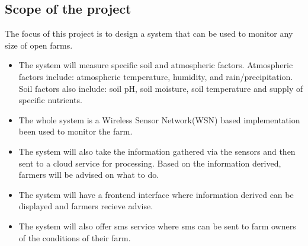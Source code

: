 \documentclass[12pt, a4paper]{article}
\begin{document}
\subsection{Scope of the project}
The focus of this project is to design a system that can be used to monitor any size of open farms.
\begin{itemize}
\item[--] The system will measure specific soil and atmospheric factors. Atmospheric factors include: atmospheric temperature, humidity, and rain/precipitation. Soil factors also include: soil pH, soil moisture, soil temperature and supply of specific nutrients.
\item[--] The whole system is a Wireless Sensor Network(WSN) based implementation been used to  monitor the farm.
\item[--] The system will also take the information gathered via the sensors and then sent to a cloud service for processing. Based on the information derived, farmers will be advised on what to do.
\item[--] The system will have a frontend interface where information derived can be displayed and farmers recieve advise.
\item[--] The system will also offer sms service where sms can be sent to farm owners of the conditions of their farm. 
\end{itemize}

\newpage
\end{document}
